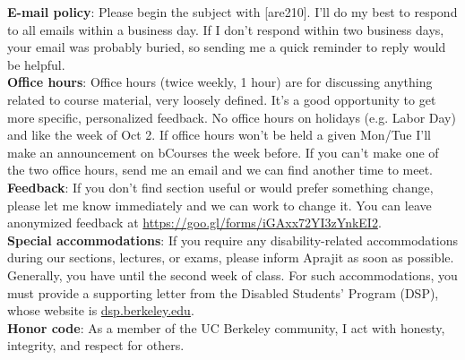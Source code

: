 \documentclass[twoside]{article}
\begin{document}
	{\bf E-mail policy}: Please begin the subject with [are210]. I'll do my best to respond to all emails within a business day. If I don't respond within two business days, your email was probably buried, so sending me a quick reminder to reply would be helpful. \\
	
	{\bf Office hours}: Office hours (twice weekly, 1 hour) are for discussing anything related to course material, very loosely defined. It's a good opportunity to get more specific, personalized feedback. No office hours on holidays (e.g. Labor Day) and like the week of Oct 2. If office hours won't be held a given Mon/Tue I'll make an announcement on bCourses the week before. If you can't make one of the two office hours, send me an email and we can find another time to meet. \\
	
	{\bf Feedback}: If you don't find section useful or would prefer something change, please let me know immediately and we can work to change it. You can leave anonymized feedback at \href{https://goo.gl/forms/iGAxx72YI3zYnkEI2}{https://goo.gl/forms/iGAxx72YI3zYnkEI2}. \\
	
	{\bf Special accommodations}: If you require any disability-related accommodations during our sections, lectures, or exams, please inform Aprajit as soon as possible. Generally, you have until the second week of class. For such accommodations, you must provide a supporting letter from the Disabled Students' Program (DSP), whose website is \href{http://dsp.berkeley.edu}{dsp.berkeley.edu}. \\
	
	{\bf Honor code}: As a member of the UC Berkeley community, I act with honesty, integrity, and respect for others.
	
\end{document}
